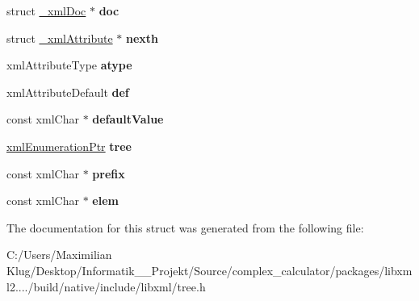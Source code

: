 \begin{DoxyCompactItemize}
\item 
\mbox{\label{struct__xml_attribute_a9cc7df019f9b6bf88a263cddf8224351}} 
struct \mbox{\hyperlink{struct__xml_doc}{\+\_\+xml\+Doc}} $\ast$ {\bfseries doc}
\item 
\mbox{\label{struct__xml_attribute_ace58b06016a83e78f9030a3a734577ea}} 
struct \mbox{\hyperlink{struct__xml_attribute}{\+\_\+xml\+Attribute}} $\ast$ {\bfseries nexth}
\item 
\mbox{\label{struct__xml_attribute_ae3a8371d4d1d21b585c5d97895c3d6dd}} 
xml\+Attribute\+Type {\bfseries atype}
\item 
\mbox{\label{struct__xml_attribute_a4e0cc0380fd2d2009bb2853e7c34423b}} 
xml\+Attribute\+Default {\bfseries def}
\item 
\mbox{\label{struct__xml_attribute_a1fd4cc9f458498c327f7fcc8730da01c}} 
const xml\+Char $\ast$ {\bfseries default\+Value}
\item 
\mbox{\label{struct__xml_attribute_a630c42587e233ede3bbbd2c8e29d5108}} 
\mbox{\hyperlink{struct__xml_enumeration}{xml\+Enumeration\+Ptr}} {\bfseries tree}
\item 
\mbox{\label{struct__xml_attribute_a9b97bd921567b53ae625daa4ef849480}} 
const xml\+Char $\ast$ {\bfseries prefix}
\item 
\mbox{\label{struct__xml_attribute_ac7911f56d58e8a476fd0a53bf529cf7e}} 
const xml\+Char $\ast$ {\bfseries elem}
\end{DoxyCompactItemize}


The documentation for this struct was generated from the following file\+:\begin{DoxyCompactItemize}
\item 
C\+:/\+Users/\+Maximilian Klug/\+Desktop/\+Informatik\+\_\+\_\+\+Projekt/\+Source/complex\+\_\+calculator/packages/libxml2..../build/native/include/libxml/tree.\+h\end{DoxyCompactItemize}
